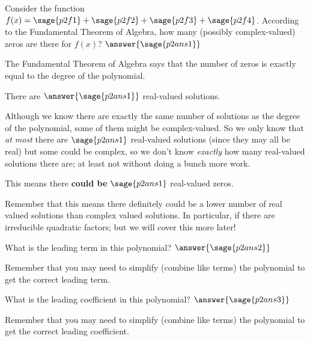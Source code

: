 \documentclass{ximera}
\begin{document}
\begin{problem}
Consider the function $f(x) = \sage{p2f1} + \sage{p2f2} + \sage{p2f3} + \sage{p2f4}$. According to the Fundamental Theorem of Algebra, how many (possibly complex-valued) zeros are there for $f(x)$? $\answer{\sage{p2ans1}}$
    \begin{feedback}
        The Fundamental Theorem of Algebra says that the number of zeros is exactly equal to the degree of the polynomial.
    \end{feedback}
    
    \begin{problem}
        There are  $\answer{\sage{p2ans1}}$ real-valued solutions. 
        \begin{feedback}[correct]
            Although we know there are exactly the same number of solutions as the degree of the polynomial, some of them might be complex-valued. So we only know that \textit{at most} there are $\sage{p2ans1}$ real-valued solutions (since they may all be real) but some could be complex, so we don't know \textit{exactly} how many real-valued solutions there are; at least not without doing a bunch more work.
        \end{feedback}
        
        \begin{problem}
            This means there \textbf{could be}  $\sage{p2ans1}$ real-valued zeros.
            \begin{feedback}[correct]
                Remember that this means there definitely could be a lower number of real valued solutions than complex valued solutions. In particular, if there are irreducible quadratic factors; but we will cover this more later!
            \end{feedback}
            
        \end{problem}
    \end{problem}
    \begin{problem}
        What is the leading term in this polynomial? $\answer{\sage{p2ans2}}$
        \begin{feedback}
            Remember that you may need to simplify (combine like terms) the polynomial to get the correct leading term.
        \end{feedback}
    \end{problem}
    \begin{problem}
        What is the leading coefficient in this polynomial? $\answer{\sage{p2ans3}}$
        \begin{feedback}
            Remember that you may need to simplify (combine like terms) the polynomial to get the correct leading coefficient.
        \end{feedback}
    \end{problem}
    
\end{problem}
\end{document}
